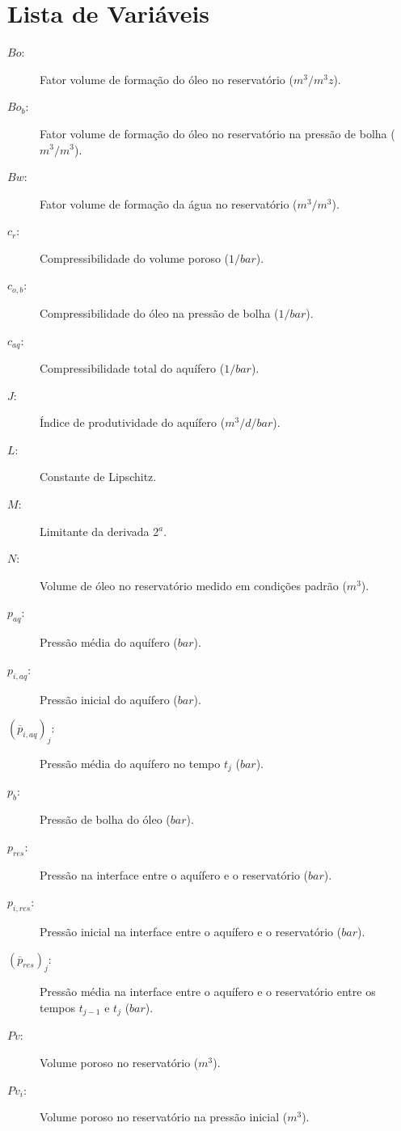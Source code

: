 \documentclass[final,5p]{elsarticle}
\numberwithin{equation}{section}
\begin{document}


\appendix

\section{Lista de Variáveis}

\begin{description}
    \item[$Bo$:]Fator volume de formação do óleo no reservatório ($m^3/m^3z$).
    \item[$Bo_b$:]Fator volume de formação do óleo no reservatório na pressão de bolha ($m^3/m^3$).
    \item[$Bw$:]Fator volume de formação da água no reservatório ($m^3/m^3$).
    \item[$c_r$:]Compressibilidade do volume poroso ($1/bar$).
    \item[$c_{o,b}$:]Compressibilidade do óleo na pressão de bolha ($1/bar$).
    \item[$c_{aq}$:]Compressibilidade total do aquífero ($1/bar$).
    \item[$J$:]Índice de produtividade do aquífero ($m^3/d/bar$).
    \item[$L$:]Constante de Lipschitz.
    \item[$M$:]Limitante da derivada 2$^a$.
    \item[$N$:]Volume de óleo no reservatório medido em condições padrão ($m^3$).
    \item[$p_{aq}$:]Pressão média do aquífero ($bar$).
    \item[$p_{i,aq}$:]Pressão inicial do aquífero ($bar$).
    \item[$(\overline{p}_{i,aq})_j$:]Pressão média do aquífero no tempo $t_j$ ($bar$).
    \item[$p_b$:]Pressão de bolha do óleo ($bar$).
    \item[$p_{res}$:]Pressão na interface entre o aquífero e o reservatório ($bar$).
    \item[$p_{i,res}$:]Pressão inicial na interface entre o aquífero e o reservatório ($bar$).
    \item[$(\overline{p}_{res})_j$:]Pressão média na interface entre o aquífero e o reservatório entre os tempos $t_{j-1}$ e $t_j$ ($bar$).
    \item[$Pv$:]Volume poroso no reservatório ($m^3$).
    \item[$Pv_i$:]Volume poroso no reservatório na pressão inicial ($m^3$).

\end{description}
\end{document}
